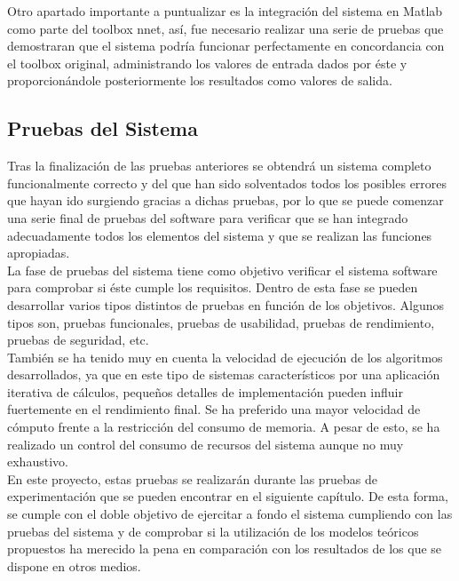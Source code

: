 			Otro apartado importante a puntualizar es la integración del sistema en Matlab como parte del toolbox nnet, así, fue necesario realizar una serie de pruebas que demostraran que el sistema podría funcionar perfectamente en concordancia con el toolbox original, administrando los valores de entrada dados por éste y proporcionándole posteriormente los resultados como valores de salida.
		
		\subsection{Pruebas del Sistema}
		
			Tras la finalización de las pruebas anteriores se obtendrá un sistema completo funcionalmente correcto y del que han sido solventados todos los posibles errores que hayan ido surgiendo gracias a dichas pruebas, por lo que se puede comenzar una serie final de pruebas del software para verificar que se han integrado adecuadamente todos los elementos del sistema y que se realizan las funciones apropiadas.\\
			
			La fase de pruebas del sistema tiene como objetivo verificar el sistema software para comprobar si éste cumple los requisitos. Dentro de esta fase se pueden desarrollar varios tipos distintos de pruebas en función de los objetivos. Algunos tipos son, pruebas funcionales, pruebas de usabilidad, pruebas de rendimiento, pruebas de seguridad, etc.\\
			
			También se ha tenido muy en cuenta la velocidad de ejecución de los algoritmos desarrollados, ya que en este tipo de sistemas característicos por una aplicación iterativa de cálculos, pequeños detalles de implementación pueden influir fuertemente en el rendimiento final. Se ha preferido una mayor velocidad de cómputo  frente a la restricción del consumo de memoria. A pesar de esto, se ha realizado un control del consumo de recursos del sistema aunque no muy exhaustivo.\\
			
			En este proyecto, estas pruebas se realizarán durante las pruebas de experimentación que se pueden encontrar en el siguiente capítulo. De esta forma, se cumple con el doble objetivo de ejercitar a fondo el sistema cumpliendo con las pruebas del sistema y de comprobar si la utilización de los modelos teóricos propuestos ha merecido la pena en comparación con los resultados de los que se dispone en otros medios.
		
